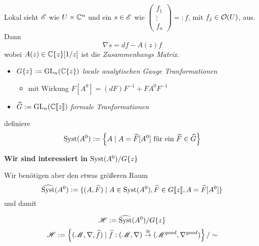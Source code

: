 \begin{rem}
  Lokal sieht $\mathscr{E}$ wie $U\times\mathbb{C}^n$ und ein $s\in\mathscr{E}$ wie
  $\begin{pmatrix}f_{1}\\ \vdots\\ f_{n} \end{pmatrix}=:f$, mit $f_j\in\mathcal{O}(U)$,
  aus.
  Dann
  \[
    \nabla s=df - A(z)f
  \]
  wobei $A(z)\in\mathbb{C}\{z\}[1/z]$ ist die \emph{Zusammenhangs Matrix}.
  \begin{comment}
    Hat $A$ werte in den 1-Formen??
  \end{comment}
  \begin{comment}
    Wollen diese Klassifizieren. Klassifiziere diese durch die Lösung von
    $\nabla s=0$. Dies ist eine DGL (ODE).
  \end{comment}
\end{rem}
\TODO[$A^0=\dots$]
\begin{defn}
  \begin{itemize}
    \item $G\{z\}:=\operatorname{GL}_n(\mathbb{C}\{z\})$ \emph{locale analytischen Gauge
      Tranformationen}
      \begin{itemize}
        \item mit Wirkung $F[A^0]=(dF)F^{-1}+FA^0F^{-1}$
      \end{itemize}
    \item $\widehat G:=\operatorname{GL}_n(\mathbb{C}\llbracket z\rrbracket)$ \emph{formale
      Tranformationen}
  \end{itemize}
  definiere
  \[
    \operatorname{Syst}(A^0)
    :=\left\{A \mid A=\widehat F[A^0]\text{ für ein }\widehat F\in\widehat G\right\}
  \]
\end{defn}
\begin{center}
  \textbf{Wir sind interessiert in $\operatorname{Syst}(A^0)/G\{z\}$}
\end{center}
Wir benötigen aber den etwas größeren Raum
\[
  \widehat{\operatorname{Syst}}(A^0):=\{(A,\widehat F)\mid A\in\operatorname{Syst}(A^0)
                                     , \widehat F\in G\llbracket z\rrbracket
                                     , A=\widehat F[A^0]\}
\]
und damit
\begin{paracol}{5}
  \[
    \mathscr{H}:=\widehat{\operatorname{Syst}}(A^0)/G\{z\}
  \]
\switchcolumn
\switchcolumn
  \[
    \mathscr{H}:=\left\{(\mathscr{M},\nabla,\widehat f)
      \mid \widehat f:(\mathscr{M},\nabla)\overset{\cong}\to(\mathscr{M}^{good},\nabla^{good})
    \right\}/\sim
  \]
\end{paracol}
